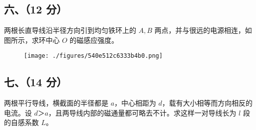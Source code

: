 \subsection{六、（12 分）}
两根长直导线沿半径方向引到均匀铁环上的 $A,B$ 两点，并与很远的电源相连，如图所示，求环中心 $O$ 的磁感应强度。
\begin{figure}[ht]
\centering
\texttt{[image: ./figures/540e512c6333b4b0.png]}
\caption{} \label{fig_NJUD3_6}
\end{figure}
\subsection{七、（14 分）}
两根平行导线，横截面的半径都是 $a$，中心相距为 $d$，载有大小相等而方向相反的电流。设 $d＞a$，且两导线内部的磁通量都可略去不计。求这样一对导线长为 $l$ 段的自感系数 $L$。